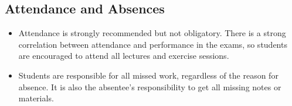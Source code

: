 \documentclass[11pt]{article}
\begin{document}
\subsection*{Attendance and Absences}
	\begin{itemize}
		\item Attendance is strongly recommended but not obligatory. There is a strong correlation between attendance and performance in the exams, so students are encouraged to attend all lectures and exercise sessions.
		\item Students are responsible for all missed work, regardless of the reason for absence. It is also the absentee's responsibility to get all missing notes or materials. 
	\end{itemize}

\newpage 
\end{document}
